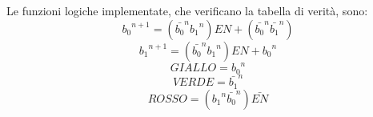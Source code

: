 Le funzioni logiche implementate, che verificano la tabella di verità, sono:
\begin{equation}
{b_0}^{n+1} = ({\bar{b_0}}^{n} {b_1}^{n}) EN + ({\bar{b_0}}^{n} {\bar{b_1}}^{n})
\label{e:eq1}
\end{equation}
\begin{equation}
{b_1}^{n+1} = ({\bar{b_0}}^{n} {b_1}^{n}) EN + {b_0}^{n}
\label{e:eq2}
\end{equation}
\begin{equation}
GIALLO = {b_0}^{n}
\label{e:eq3}
\end{equation}
\begin{equation}
VERDE = {\bar{b_1}}^{n}
\label{e:eq4}
\end{equation}
\begin{equation}
ROSSO = ({b_1}^{n} {\bar{b_0}}^{n}) \bar{EN}
\label{e:eq5}
\end{equation}


